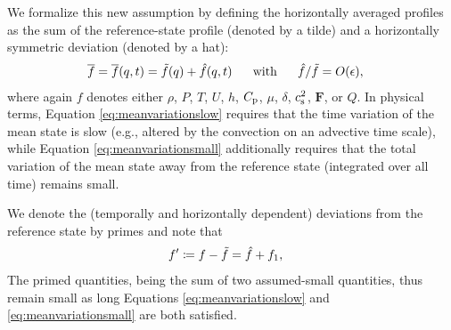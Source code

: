 \documentclass[12pt]{article}
\newcommand{\vecf}{\bm{F}}
\begin{document}
We formalize this new assumption by defining the horizontally averaged profiles as the sum of the reference-state profile (denoted by a tilde) and a horizontally symmetric deviation (denoted by a hat):
\begin{align}\label{eq:meanvariationsmall}
\overline{f}=\overline{f}(q,t) &= \tilde{f}(q) + \hat{f}(q,t)\ \ \ \ \ \text{with}\ \ \ \ \  \hat{f}/\tilde{f} = O(\epsilon),
\end{align}
where again $f$ denotes either $\rho$, $P$, $T$, $U$, $h$, $C_{\rm{p}}$, $\mu$, $\delta$, $c_{\rm s}^2$, $\vecf$, or $Q$. In physical terms, Equation \eqref{eq:meanvariationslow} requires that the time variation of the mean state is slow (e.g., altered by the convection on an advective time scale), while Equation \eqref{eq:meanvariationsmall} additionally requires that the total variation of the mean state away from the reference state (integrated over all time) remains small. 

We denote the (temporally and horizontally dependent) deviations from the reference state by primes and note that 
\begin{align}\label{eq:defprime}
	f^\prime & \coloneqq f - \tilde{f} =\hat{f} +  f_1,
\end{align}
The primed quantities, being the sum of two assumed-small quantities, thus remain small as long Equations \eqref{eq:meanvariationslow} and \eqref{eq:meanvariationsmall} are both satisfied. 

\end{document}
